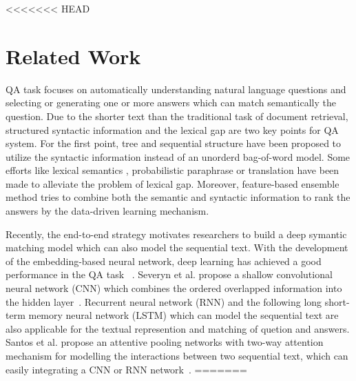 \documentclass{llncs}
\begin{document}
<<<<<<< HEAD

\section{Related Work}
\label{sec:relatedword}

QA task focuses on automatically understanding natural language questions and selecting or generating one or more answers which can match semantically the question. %
Due to the shorter text than the traditional task of document retrieval, structured  syntactic information and  the lexical gap are two key points for QA system. 
For the first point, tree \cite{Yao2013Answer} and sequential \cite{Wang2015FAQ} structure have been proposed to utilize the syntactic information instead of an  unorderd bag-of-word model.
Some efforts like lexical semantics \cite{Yih2013Question}, probabilistic paraphrase or translation \cite{Zhou2011Phrase} have been made to alleviate the problem of lexical gap.
Moreover, feature-based ensemble method \cite{Severyn2013Automatic} tries to combine both the semantic and syntactic information to rank the answers by the data-driven learning mechanism. 

Recently, the end-to-end strategy motivates researchers to build a deep symantic matching model which can also model the sequential text. With the development of the embedding-based neural network, deep learning has achieved a good performance in the QA task~ \cite{Yu2014Deep}\cite{Feng2015Applying}. Severyn et al. propose a shallow convolutional neural network (CNN) which combines the ordered overlapped information into the hidden layer~\cite{severyn2015learning}. Recurrent neural network (RNN) and the following long short-term memory neural network (LSTM) \cite{Wang2015A}\cite{Tan2015LSTM} which can model the sequential text are also applicable for the textual represention and matching of quetion and answers. Santos et al. propose an attentive pooling networks with two-way attention mechanism for modelling the interactions between two sequential text, which can easily integrating a CNN or RNN network~\cite{Santos2016Attentive}. 
=======
\end{document}
